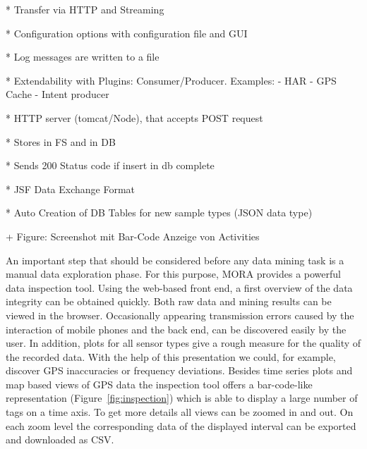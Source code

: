 \documentclass[times, 10pt,twocolumn]{article}
\begin{document}
* Transfer via HTTP and Streaming

* Configuration options with configuration file and GUI

* Log messages are written to a file

* Extendability with Plugins: Consumer/Producer. Examples:
  - HAR
  - GPS Cache
  - Intent producer


* HTTP server (tomcat/Node), that accepts POST request

* Stores in FS and in DB

* Sends 200 Status code if insert in db complete

* JSF Data Exchange Format

* Auto Creation of DB Tables for new sample types (JSON data type)



+ Figure: Screenshot mit Bar-Code Anzeige von Activities


An important step that should be considered before any data mining task is a manual data exploration phase. For this purpose, MORA provides a powerful data inspection tool. Using the web-based front end, a first overview of the data integrity can be obtained quickly. Both raw data and mining results can be viewed in the browser. Occasionally appearing transmission errors caused by the interaction of mobile phones and the back end, can be discovered easily by the user. In addition, plots for all sensor types give a rough measure for the quality of the recorded data. With the help of this presentation we could, for example, discover GPS inaccuracies or frequency deviations. Besides time series plots and map based views of GPS data the inspection tool offers a bar-code-like representation (Figure~\ref{fig:inspection}) which is able to display a large number of tags on a time axis. To get more details all views can be zoomed in and out. On each zoom level the corresponding data of the displayed interval can be exported and downloaded as CSV.
\end{document}

